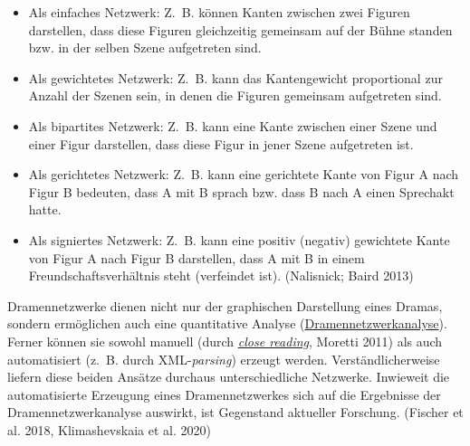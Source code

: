 \documentclass{article}
\begin{document}
        \begin{itemize}\item {Als einfaches Netzwerk: Z. B. können Kanten zwischen zwei Figuren darstellen, dass diese Figuren gleichzeitig gemeinsam auf der Bühne standen bzw. in der selben Szene aufgetreten sind.}\item {Als gewichtetes Netzwerk: Z. B. kann das Kantengewicht proportional zur Anzahl der Szenen sein, in denen die Figuren gemeinsam aufgetreten sind.}\item {Als bipartites Netzwerk: Z. B. kann eine Kante zwischen einer Szene und einer Figur darstellen, dass diese Figur in jener Szene aufgetreten ist.}\item {Als gerichtetes Netzwerk: Z. B. kann eine gerichtete Kante von Figur A nach Figur B bedeuten, dass A mit B sprach bzw. dass B nach A einen Sprechakt hatte.}\item {Als signiertes Netzwerk: Z. B. kann eine positiv (negativ) gewichtete Kante von Figur A nach Figur B darstellen, dass A mit B in einem Freundschaftsverhältnis steht (verfeindet ist). (Nalisnick; Baird 2013)}\end{itemize}Dramennetzwerke dienen nicht nur der graphischen Darstellung eines Dramas, sondern ermöglichen auch eine quantitative Analyse (\href{http://gams.uni-graz.at/o:konde.74}{Dramennetzwerkanalyse}). Ferner können sie sowohl manuell (durch \emph{\href{http://gams.uni-graz.at/o:konde.71}{close reading}}, Moretti 2011) als auch automatisiert (z. B. durch XML-\emph{parsing}) erzeugt werden. Verständlicherweise liefern diese beiden Ansätze durchaus unterschiedliche Netzwerke. Inwieweit die automatisierte Erzeugung eines Dramennetzwerkes sich auf die Ergebnisse der Dramennetzwerkanalyse auswirkt, ist Gegenstand aktueller Forschung. (Fischer et al. 2018, Klimashevskaia et al. 2020)\\
            
\end{document}
